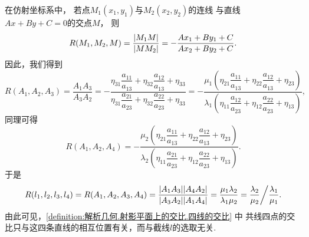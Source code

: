 在仿射坐标系中，
若点\(M_1(x_1,y_1)\)与\(M_2(x_2,y_2)\)的连线
与直线\(A x + B y + C = 0\)的交点\(M\)，
则\begin{equation*}
	R(M_1,M_2,M)
	= \frac{\abs{M_1M}}{\abs{MM_2}}
	= -\frac{A x_1 + B y_1 + C}{A x_2 + B y_2 + C}.
\end{equation*}
因此，我们得到\begin{equation*}
	R(A_1,A_2,A_3)
	= \frac{A_1A_3}{A_3A_2}
	= -\frac{\eta_{31} \dfrac{a_{11}}{a_{13}} + \eta_{32} \dfrac{a_{12}}{a_{13}} + \eta_{33}}
			{\eta_{31} \dfrac{a_{21}}{a_{23}} + \eta_{32} \dfrac{a_{22}}{a_{23}} + \eta_{33}}
	= -\frac{\mu_1 \left( \eta_{21} \dfrac{a_{11}}{a_{13}} + \eta_{22} \dfrac{a_{12}}{a_{13}} + \eta_{23} \right)}
			{\lambda_1 \left( \eta_{11} \dfrac{a_{12}}{a_{23}} + \eta_{12} \dfrac{a_{22}}{a_{23}} + \eta_{13} \right)},
\end{equation*}
同理可得\begin{equation*}
	R(A_1,A_2,A_4)
	= -\frac{\mu_2 \left( \eta_{21} \dfrac{a_{11}}{a_{13}} + \eta_{22} \dfrac{a_{12}}{a_{13}} + \eta_{23} \right)}
			{\lambda_2 \left( \eta_{11} \dfrac{a_{21}}{a_{23}} + \eta_{12} \dfrac{a_{22}}{a_{23}} + \eta_{13} \right)}.
\end{equation*}
于是\begin{equation*}
	R(l_1,l_2,l_3,l_4)
	= R(A_1,A_2,A_3,A_4)
	= \frac{\abs{A_1A_3} \abs{A_4A_2}}
			{\abs{A_3A_2} \abs{A_1A_4}}
	= \frac{\mu_1 \lambda_2}{\lambda_1 \mu_2}
	= \frac{\lambda_2}{\mu_2} \bigg/ \frac{\lambda_1}{\mu_1}.
\end{equation*}
由此可见，\cref{definition:解析几何.射影平面上的交比.四线的交比} 中
共线四点的交比只与这四条直线的相互位置有关，而与截线\(l\)的选取无关.

\begin{figure}[hbt]
	\centering
	\caption{}
	\label{figure:解析几何.射影平面上的交比.四线的交比1}
\end{figure}

